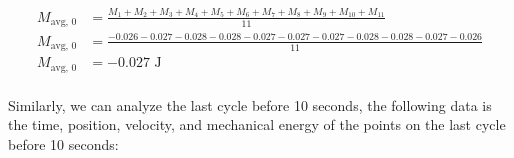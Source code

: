 \documentclass{article}
\begin{document}
            \begin{equation}
                \begin{aligned}
                    M_{\text{avg, 0}} &= \frac{M_1 + M_2 + M_3 + M_4 + M_5 + M_6 + M_7 + M_8 + M_9 + M_{10} + M_{11}}{11} \\
                    M_{\text{avg, 0}} &= \frac{-0.026 -0.027 -0.028 -0.028 -0.027 -0.027 -0.027 -0.028 -0.028 -0.027 -0.026}{11} \\
                    M_{\text{avg, 0}} &= -0.027 \text{ J} \\
                \end{aligned}\label{eq:average-mechanical-energy-first-cycle}
            \end{equation}
            
            Similarly, we can analyze the last cycle before 10 seconds, the following data is the time, position, velocity, and mechanical energy of the points on the last cycle before 10 seconds:
            
\end{document}
